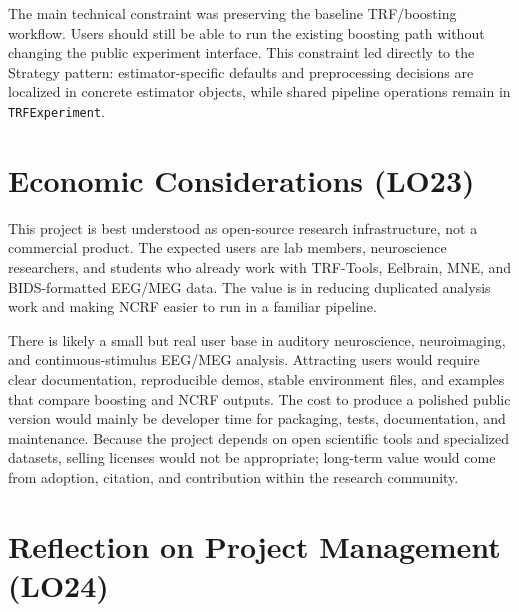 \documentclass{article}
\begin{document}
The main technical constraint was preserving the baseline TRF/boosting workflow. Users should still be able to run the existing boosting path without changing the public experiment interface. This constraint led directly to the Strategy pattern: estimator-specific defaults and preprocessing decisions are localized in concrete estimator objects, while shared pipeline operations remain in \texttt{TRFExperiment}.

\section{Economic Considerations (LO23)}


This project is best understood as open-source research infrastructure, not a commercial product. The expected users are lab members, neuroscience researchers, and students who already work with TRF-Tools, Eelbrain, MNE, and BIDS-formatted EEG/MEG data. The value is in reducing duplicated analysis work and making NCRF easier to run in a familiar pipeline.

There is likely a small but real user base in auditory neuroscience, neuroimaging, and continuous-stimulus EEG/MEG analysis. Attracting users would require clear documentation, reproducible demos, stable environment files, and examples that compare boosting and NCRF outputs. The cost to produce a polished public version would mainly be developer time for packaging, tests, documentation, and maintenance. Because the project depends on open scientific tools and specialized datasets, selling licenses would not be appropriate; long-term value would come from adoption, citation, and contribution within the research community.

\section{Reflection on Project Management (LO24)}

\end{document}
